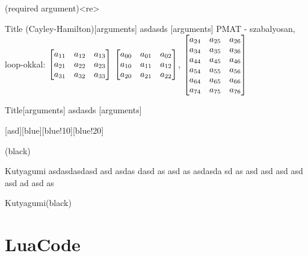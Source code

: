\documentclass[12pt]{article}
\begin{document}
    \begin{pczLearnEnvironment}\alpha{}(required argument)<re>
    \end{pczLearnEnvironment}

    \begin{pcolorbox}{Title (Cayley-Hamilton)}[arguments]
        asdasds
    [arguments]
    PMAT - szabalyosan, loop-okkal:
    $\bmqty{\xmat*{a}{3}{3}}$
    $\bmqty{\pmat*{a}{3}{3}}$,
    $\bmqty{\pmat*{a}[2]{8}[4]{7}}$
    \end{pcolorbox}

    \begin{pcolorbox}{Title}[arguments]\matlab
        asdasds
    [arguments]\matlab
    \end{pcolorbox}

    \begin{pcolorbox}[notitle]{}[asd][blue][blue!10][blue!20]
        \lipsum[1]
    \end{pcolorbox}

    \begin{pcbexample}
        \lipsum[2]
    \end{pcbexample}

    \begin{cTheorem}

    \end{cTheorem}

    \color{black}
    (black)

    \Hiba*[blue]
    Kutyagumi asdasdasdasd asd asdas dasd as asd as
    asdasda sd as asd asd asd asd asd ad asd as

    \color{black}
    Kutyagumi(black)



\listoftodosangol

\begin{tcolorbox}[breakable,title=My breakable box]
  \lipsum[1-6]
\end{tcolorbox}



\Normal\n
\section{LuaCode}
\newcommand{\luapmat}[4]{%
  $\directlua{ paren_array(\luatexluaescapestring{#1},\luatexluaescapestring{#2},\luatexluaescapestring{#3},\luatexluaescapestring{#4}) }$
}
\end{document}
